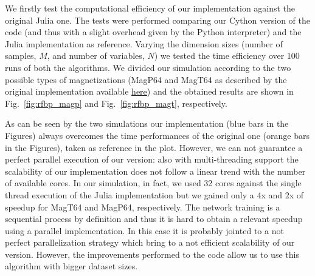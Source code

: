 \documentclass{standalone}
\begin{document}
We firstly test the computational efficiency of our implementation against the original \textsf{Julia} one.
The tests were performed comparing our \textsf{Cython} version of the code (and thus with a slight overhead given by the \textsf{Python} interpreter) and the \textsf{Julia} implementation as reference.
Varying the dimension sizes (number of samples, $M$, and number of variables, $N$) we tested the time efficiency over 100 runs of both the algorithms.
We divided our simulation according to the two possible types of magnetizations (\textsf{MagP64} and \textsf{MagT64} as described by the original implementation available \href{https://github.com/carlobaldassi/BinaryCommitteeMachineFBP.jl}{here}) and the obtained results are shown in Fig.~\ref{fig:rfbp_magp} and Fig.~\ref{fig:rfbp_magt}, respectively.

As can be seen by the two simulations our implementation (blue bars in the Figures) always overcomes the time performances of the original one (orange bars in the Figures), taken as reference in the plot.
However, we can not guarantee a perfect parallel execution of our version: also with multi-threading support the scalability of our implementation does not follow a linear trend with the number of available cores.
In our simulation, in fact, we used 32 cores against the single thread execution of the \textsf{Julia} implementation but we gained only a $4$x and $2$x of speedup for \textsf{MagT64} and \textsf{MagP64}, respectively.
The network training is a sequential process by definition and thus it is hard to obtain a relevant speedup using a parallel implementation.
In this case it is probably jointed to a not perfect parallelization strategy which bring to a not efficient scalability of our version.
However, the improvements performed to the code allow us to use this algorithm with bigger dataset sizes.
\end{document}
